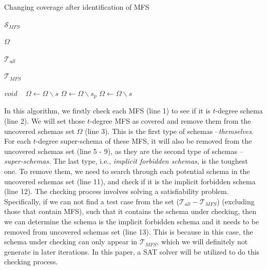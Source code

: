 \documentclass{sig-alternate}
\begin{document}
\begin{algorithm}
  \caption{Changing coverage after identification of MFS}
  \begin{algorithmic}[1]
     \Require



     $\mathcal{S}_{MFS}$ 

     $\Omega$ 


     $\mathcal{T}_{all}$ 

     $\mathcal{T}_{MFS}$ 

\Ensure  $void$ 
\
          \State $\Omega \leftarrow \Omega \backslash s$
       \EndIf
          \State $\Omega \leftarrow \Omega \backslash s_{p}$
         \EndIf
       \EndFor
     \EndFor
         \State  $\Omega \leftarrow \Omega \backslash s$
       \EndIf
     \EndFor
  \end{algorithmic}
\end{algorithm}

 In this algorithm, we firstly check each MFS (line 1) to see if it is $t$-degree schema (line 2). We will set those $t$-degree MFS as covered and remove them from the uncovered schemas set $\Omega$ (line 3). This is the first type of schemas --\emph{themselves}. For each $t$-degree super-schema of these MFS, it will also be removed from the uncovered schemas set (line 5 - 9), as they are the second type of schemas --  \emph{super-schemas}. The last type, i.e., \emph{implicit forbidden schemas}, is the toughest one. To remove them, we need to search through each potential schema in the uncovered schemas set (line 11), and check if it is the implicit forbidden schema (line 12). The checking process involves solving a satisfiability problem. Specifically, if we can not find a test case from  the set ($\mathcal{T}_{all} - \mathcal{T}_{MFS}$) (excluding those that contain MFS), such that it contains the schema under checking, then we can determine the schema is the implicit forbidden schema and it needs to be removed from uncovered schemas set (line 13). This is because in this case, the schema under checking can only appear in $\mathcal{T}_{MFS}$, which we will definitely not generate in later iterations. In this paper, a SAT solver will be utilized to do this checking process.
\end{document}
